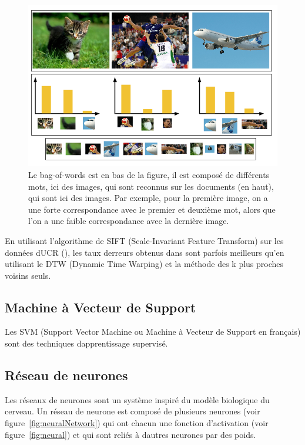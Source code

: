\documentclass[11pt]{sdm}
\begin{document}
		\begin{figure}[!ht]
			\centering
			\includegraphics[scale=0.6,natwidth=680,natheight=440]{figures/bagOfWords.png}
			\caption{Le bag-of-words est en bas de la figure, il est compos\'e de diff\'erents mots, ici des images, qui sont reconnus sur les documents (en haut), qui sont ici des images. Par exemple, pour la premi\`ere image, on a une forte correspondance avec le premier et deuxi\`eme mot, alors que l’on a une faible correspondance avec la derni\`ere image.}
			\label{fig:BoW}
		\end{figure}

		En utilisant l'algorithme de SIFT (Scale-Invariant Feature Transform) sur les donn\'ees d\textquotesingle UCR (\cite{UCRArchive}), les taux d\textquotesingle erreurs obtenus dans \cite{bailly2015bag} sont parfois meilleurs qu'en utilisant le DTW (Dynamic Time Warping) et la méthode des k plus proches voisins seuls.

	\subsection{Machine \`a Vecteur de Support}
		Les SVM (Support Vector Machine ou Machine \`a Vecteur de Support en fran\c cais) sont des techniques d\textquotesingle apprentissage supervis\'e. 

	\subsection{R\'eseau de neurones}
		Les r\'eseaux de neurones sont un syst\`eme inspir\'e du mod\`ele biologique du cerveau. Un r\'eseau de neurone est compos\'e de plusieurs neurones (voir figure~\ref{fig:neuralNetwork}) qui ont chacun une fonction d’activation (voir figure~\ref{fig:neural}) et qui sont reli\'es \`a d\textquotesingle autres neurones par des poids.
\end{document}
